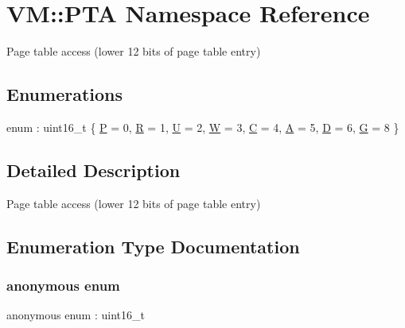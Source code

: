 \hypertarget{namespace_v_m_1_1_p_t_a}{}\section{VM\+:\+:P\+TA Namespace Reference}
\label{namespace_v_m_1_1_p_t_a}


Page table access (lower 12 bits of page table entry)  


\subsection*{Enumerations}
\begin{DoxyCompactItemize}
\item 
enum \+: uint16\+\_\+t \{ \newline
\hyperlink{namespace_v_m_1_1_p_t_a_a89a9cf444829a1e2681beab7a219fea5a807772f9595a363566fba6fdf733e8f9}{P} = 0, 
\hyperlink{namespace_v_m_1_1_p_t_a_a89a9cf444829a1e2681beab7a219fea5a8845432dbb156062ae5103d618c41d75}{R} = 1, 
\hyperlink{namespace_v_m_1_1_p_t_a_a89a9cf444829a1e2681beab7a219fea5a1328ecb0d0d696708fff0e2492b864be}{U} = 2, 
\hyperlink{namespace_v_m_1_1_p_t_a_a89a9cf444829a1e2681beab7a219fea5a09b0f0ebacacbb343e02d17dedc2ed4e}{W} = 3, 
\newline
\hyperlink{namespace_v_m_1_1_p_t_a_a89a9cf444829a1e2681beab7a219fea5a789da119278c61f741fe1ed3efc8e0d3}{C} = 4, 
\hyperlink{namespace_v_m_1_1_p_t_a_a89a9cf444829a1e2681beab7a219fea5a0bffb3e999362e382526209e130dec62}{A} = 5, 
\hyperlink{namespace_v_m_1_1_p_t_a_a89a9cf444829a1e2681beab7a219fea5ac77057cf7fa6ca270c2b31f0c24125df}{D} = 6, 
\hyperlink{namespace_v_m_1_1_p_t_a_a89a9cf444829a1e2681beab7a219fea5a07e37da4a960b9f69565a92c812da75c}{G} = 8
 \}
\end{DoxyCompactItemize}


\subsection{Detailed Description}
Page table access (lower 12 bits of page table entry) 

\subsection{Enumeration Type Documentation}
\mbox{\label{namespace_v_m_1_1_p_t_a_a89a9cf444829a1e2681beab7a219fea5}} 
\subsubsection{\texorpdfstring{anonymous enum}{anonymous enum}}
{\footnotesize\ttfamily anonymous enum \+: uint16\+\_\+t}

